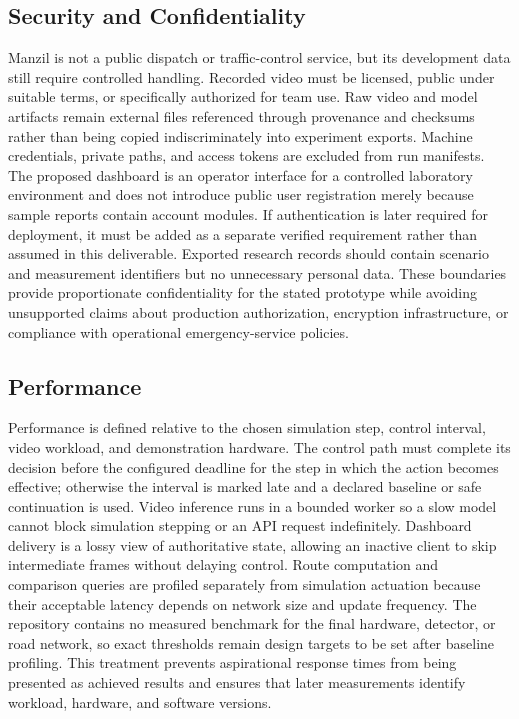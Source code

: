 \subsection{Security and Confidentiality}

Manzil is not a public dispatch or traffic-control service, but its development data still require controlled handling. Recorded video must be licensed, public under suitable terms, or specifically authorized for team use. Raw video and model artifacts remain external files referenced through provenance and checksums rather than being copied indiscriminately into experiment exports. Machine credentials, private paths, and access tokens are excluded from run manifests. The proposed dashboard is an operator interface for a controlled laboratory environment and does not introduce public user registration merely because sample reports contain account modules. If authentication is later required for deployment, it must be added as a separate verified requirement rather than assumed in this deliverable. Exported research records should contain scenario and measurement identifiers but no unnecessary personal data. These boundaries provide proportionate confidentiality for the stated prototype while avoiding unsupported claims about production authorization, encryption infrastructure, or compliance with operational emergency-service policies.

\subsection{Performance}

Performance is defined relative to the chosen simulation step, control interval, video workload, and demonstration hardware. The control path must complete its decision before the configured deadline for the step in which the action becomes effective; otherwise the interval is marked late and a declared baseline or safe continuation is used. Video inference runs in a bounded worker so a slow model cannot block simulation stepping or an API request indefinitely. Dashboard delivery is a lossy view of authoritative state, allowing an inactive client to skip intermediate frames without delaying control. Route computation and comparison queries are profiled separately from simulation actuation because their acceptable latency depends on network size and update frequency. The repository contains no measured benchmark for the final hardware, detector, or road network, so exact thresholds remain design targets to be set after baseline profiling. This treatment prevents aspirational response times from being presented as achieved results and ensures that later measurements identify workload, hardware, and software versions.

